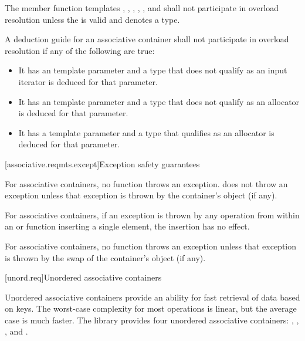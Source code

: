 \pnum
The member function templates
, , ,
, , and 
shall not participate in overload resolution unless
the   is valid
and denotes a type.

\pnum
A deduction guide for an associative container shall not participate in overload resolution
if any of the following are true:
\begin{itemize}
\item It has an  template parameter
and a type that does not qualify as an input iterator is deduced for that parameter.

\item It has an  template parameter
and a type that does not qualify as an allocator is deduced for that parameter.

\item It has a  template parameter
and a type that qualifies as an allocator is deduced for that parameter.
\end{itemize}

%
%
[associative.reqmts.except]{Exception safety guarantees}

\pnum
For associative containers, no  function throws an exception.
 does not throw an exception unless that exception is thrown
by the container's  object (if any).

\pnum
For associative containers, if an exception is thrown by any operation from
within an  or  function inserting a single element, the
insertion has no effect.

\pnum
For associative containers, no  function throws an exception unless
that exception is thrown by the
swap of the container's  object (if any).

[unord.req]{Unordered associative containers}

\pnum
{}%
Unordered associative containers provide an ability for fast retrieval
of data based on keys.  The worst-case complexity for most operations
is linear, but the average case is much faster.  The library provides
four unordered associative containers: ,
, , and
.

